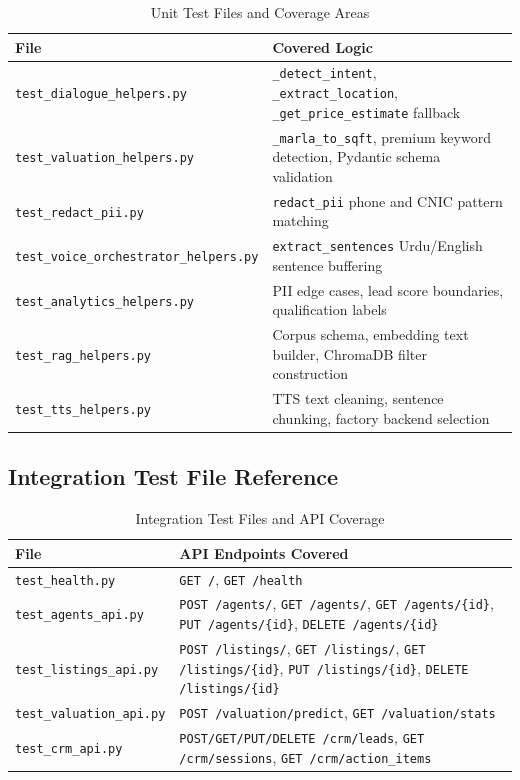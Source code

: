\begin{table}[H]
\centering
\caption{Unit Test Files and Coverage Areas}
\renewcommand{\arraystretch}{1.2}
\begin{tabular}{|l|p{9cm}|}
\hline
\textbf{File} & \textbf{Covered Logic} \\ \hline
\texttt{test\_dialogue\_helpers.py} & \texttt{\_detect\_intent}, \texttt{\_extract\_location}, \texttt{\_get\_price\_estimate} fallback \\ \hline
\texttt{test\_valuation\_helpers.py} & \texttt{\_marla\_to\_sqft}, premium keyword detection, Pydantic schema validation \\ \hline
\texttt{test\_redact\_pii.py} & \texttt{redact\_pii} phone and CNIC pattern matching \\ \hline
\texttt{test\_voice\_orchestrator\_helpers.py} & \texttt{extract\_sentences} Urdu/English sentence buffering \\ \hline
\texttt{test\_analytics\_helpers.py} & PII edge cases, lead score boundaries, qualification labels \\ \hline
\texttt{test\_rag\_helpers.py} & Corpus schema, embedding text builder, ChromaDB filter construction \\ \hline
\texttt{test\_tts\_helpers.py} & TTS text cleaning, sentence chunking, factory backend selection \\ \hline
\end{tabular}
\label{tab:app-unit-tests}
\end{table}

\subsection{Integration Test File Reference}

\begin{table}[H]
\centering
\caption{Integration Test Files and API Coverage}
\renewcommand{\arraystretch}{1.2}
\begin{tabular}{|l|p{9cm}|}
\hline
\textbf{File} & \textbf{API Endpoints Covered} \\ \hline
\texttt{test\_health.py} & \texttt{GET /}, \texttt{GET /health} \\ \hline
\texttt{test\_agents\_api.py} & \texttt{POST /agents/}, \texttt{GET /agents/}, \texttt{GET /agents/\{id\}}, \texttt{PUT /agents/\{id\}}, \texttt{DELETE /agents/\{id\}} \\ \hline
\texttt{test\_listings\_api.py} & \texttt{POST /listings/}, \texttt{GET /listings/}, \texttt{GET /listings/\{id\}}, \texttt{PUT /listings/\{id\}}, \texttt{DELETE /listings/\{id\}} \\ \hline
\texttt{test\_valuation\_api.py} & \texttt{POST /valuation/predict}, \texttt{GET /valuation/stats} \\ \hline
\texttt{test\_crm\_api.py} & \texttt{POST/GET/PUT/DELETE /crm/leads}, \texttt{GET /crm/sessions}, \texttt{GET /crm/action\_items} \\ \hline
\end{tabular}
\label{tab:app-integration-tests}
\end{table}